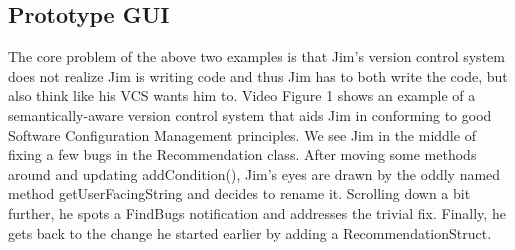 \documentclass[conference]{IEEEtran}
\begin{document}




\subsection{Prototype GUI}

The core problem of the above two examples is that Jim's version control system does not
realize Jim is writing code and thus Jim has to both write the code, but also think like
his VCS wants him to.  
Video Figure 1 shows an example of a semantically-aware version control system that aids
Jim in conforming to good Software Configuration Management principles.
We see Jim in the middle of fixing a few bugs in the Recommendation class.  
After moving some methods around and updating addCondition(), Jim's eyes are drawn by the 
oddly named method getUserFacingString and decides to rename it.
Scrolling down a bit further, he spots a FindBugs notification and addresses the trivial fix.
Finally, he gets back to the change he started earlier by adding a RecommendationStruct.
\end{document}
